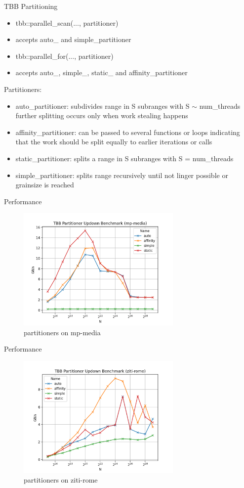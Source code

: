 \begin{frame}{TBB Partitioning} 
	\begin{itemize}
		\item tbb::parallel\_scan(..., partitioner)
		\item accepts auto\_ and simple\_partitioner
		\item tbb::parallel\_for(..., partitioner)
		\item accepts auto\_, simple\_, static\_ and affinity\_partitioner
	\end{itemize}
\end{frame} 

\begin{frame}{Partitioners:}
	\begin{itemize}
		\item auto\_partitioner: subdivides range in S subranges with S $\sim$ num\_threads further splitting occurs only when work stealing happens
		\item affinity\_partitioner: can be passed to several functions or loops indicating that the work should be split equally to earlier iterations or calls
		\item static\_partitioner: splits a range in S subranges with S = num\_threads
		\item simple\_partitioner: splits range recursively until not linger possible or grainsize is reached
	\end{itemize}
\end{frame}

\begin{frame}{Performance}
	\begin{figure}
		\includegraphics[width=80mm]{wiki/TBB Partitioner Updown Benchmark (mp-media).png}
		\caption{{partitioners on mp-media}}
	\end{figure}
\end{frame}

\begin{frame}{Performance}
	\begin{figure}
		\includegraphics[width=80mm]{wiki/TBB Partitioner Updown Benchmark (ziti-rome).png}
		\caption{{partitioners on ziti-rome}}
	\end{figure}
\end{frame}